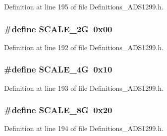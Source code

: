 Definition at line 195 of file Definitions\+\_\+\+A\+D\+S1299.\+h.

\subsubsection[{\texorpdfstring{S\+C\+A\+L\+E\+\_\+2G}{SCALE_2G}}]{\setlength{\rightskip}{0pt plus 5cm}\#define S\+C\+A\+L\+E\+\_\+2G~0x00}\hypertarget{group__Definitions__ADS1299_ga538f9ede8e121647077b12176339ac5c}{}\label{group__Definitions__ADS1299_ga538f9ede8e121647077b12176339ac5c}


Definition at line 192 of file Definitions\+\_\+\+A\+D\+S1299.\+h.

\subsubsection[{\texorpdfstring{S\+C\+A\+L\+E\+\_\+4G}{SCALE_4G}}]{\setlength{\rightskip}{0pt plus 5cm}\#define S\+C\+A\+L\+E\+\_\+4G~0x10}\hypertarget{group__Definitions__ADS1299_gae3f6336c2afcc6a107745c1679394538}{}\label{group__Definitions__ADS1299_gae3f6336c2afcc6a107745c1679394538}


Definition at line 193 of file Definitions\+\_\+\+A\+D\+S1299.\+h.

\subsubsection[{\texorpdfstring{S\+C\+A\+L\+E\+\_\+8G}{SCALE_8G}}]{\setlength{\rightskip}{0pt plus 5cm}\#define S\+C\+A\+L\+E\+\_\+8G~0x20}\hypertarget{group__Definitions__ADS1299_ga2647f28c119ef3da1c36c5b212a189b3}{}\label{group__Definitions__ADS1299_ga2647f28c119ef3da1c36c5b212a189b3}


Definition at line 194 of file Definitions\+\_\+\+A\+D\+S1299.\+h.

